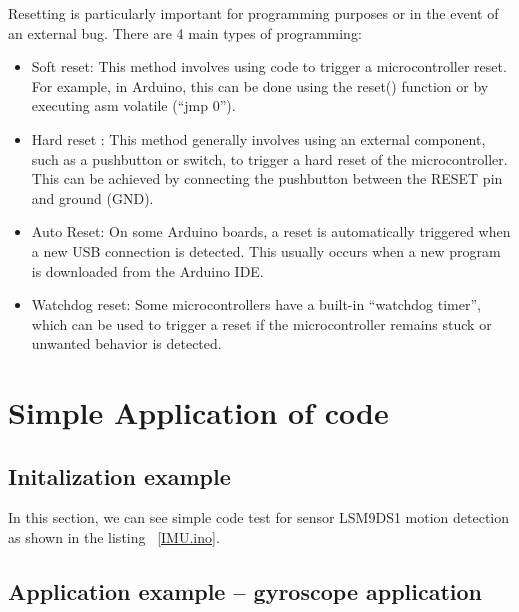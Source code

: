 Resetting is particularly important for programming purposes or in the event of an external bug. There are 4 main types of programming: 

\begin{itemize}
	\item Soft reset: This method involves using code to trigger a microcontroller reset. For example, in Arduino, this can be done using the reset() function or by executing asm volatile (“jmp 0”). \cite{instructables_reset_arduino:2024}
	\item Hard reset : This method generally involves using an external component, such as a pushbutton or switch, to trigger a hard reset of the microcontroller. This can be achieved by connecting the pushbutton between the RESET pin and ground (GND). \cite{arduino_reset:2024}
	\item Auto Reset: On some Arduino boards, a reset is automatically triggered when a new USB connection is detected. This usually occurs when a new program is downloaded from the Arduino IDE. \cite{stackoverflow_reset_arduino:2025}
	\item Watchdog reset: Some microcontrollers have a built-in “watchdog timer”, which can be used to trigger a reset if the microcontroller remains stuck or unwanted behavior is detected. \cite{youtube_watchdog_reset:2025}
	
\end{itemize}

\section{Simple Application of code}

\subsection{Initalization example}

In this section, we can see simple code test for sensor LSM9DS1 motion detection as shown in the listing ~\ref{IMU.ino}.


{
	
	\label{IMU.ino}
}	


\subsection{Application example -- gyroscope application}

